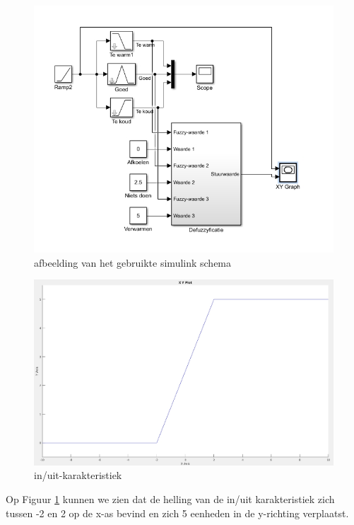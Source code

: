 \documentclass[a4paper, 12pt]{article}
\begin{document}
\begin{figure}[!h]
	\includegraphics[width=1\linewidth]{Labo4_1_test_regelaar_screen.jpg}
	\caption{afbeelding van het gebruikte simulink schema}
\end{figure}

\begin{figure}[!h]
	\includegraphics[width=1\linewidth]{Labo4_1_xy-plot.jpg}
	\caption{in/uit-karakteristiek}
	\label{fig:in/uit}
\end{figure}

\newpage

Op Figuur \ref{fig:in/uit} kunnen we zien dat de helling van de in/uit karakteristiek zich tussen -2 en 2 op de x-as bevind en zich 5 eenheden in de y-richting verplaatst. \\
\end{document}
